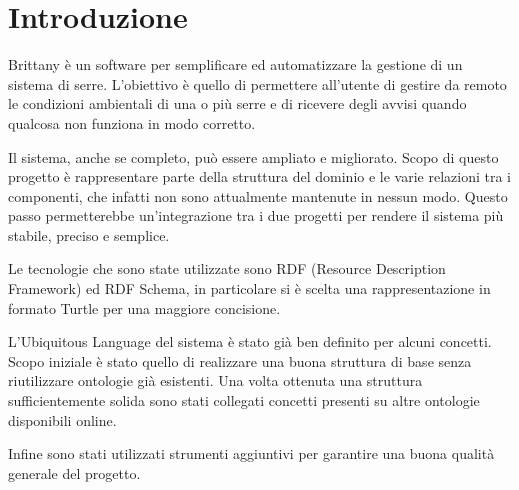 \section{Introduzione}
Brittany è un software per semplificare ed automatizzare la gestione di un sistema di serre. L'obiettivo è quello di permettere all'utente di gestire da remoto le condizioni ambientali di una o più serre e di ricevere degli avvisi quando qualcosa non funziona in modo corretto.\newline

\noindent Il sistema, anche se completo, può essere ampliato e migliorato. Scopo di questo progetto è rappresentare parte della struttura del dominio e le varie relazioni tra i componenti, che infatti non sono attualmente mantenute in nessun modo. Questo passo permetterebbe un'integrazione tra i due progetti per rendere il sistema più stabile, preciso e semplice.\newline

\noindent Le tecnologie che sono state utilizzate sono RDF (Resource Description Framework) ed RDF Schema, in particolare si è scelta una rappresentazione in formato Turtle per una maggiore concisione.\newline

\noindent L'Ubiquitous Language del sistema è stato già ben definito per alcuni concetti. Scopo iniziale è stato quello di realizzare una buona struttura di base senza riutilizzare ontologie già esistenti. Una volta ottenuta una struttura sufficientemente solida sono stati collegati concetti presenti su altre ontologie disponibili online.\newline

\noindent Infine sono stati utilizzati strumenti aggiuntivi per garantire una buona qualità generale del progetto.

